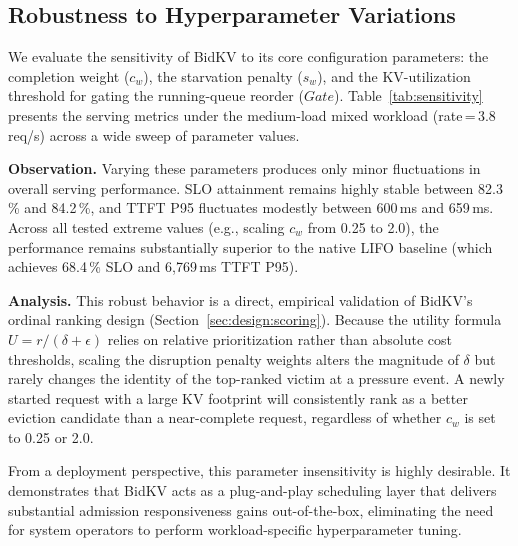 \documentclass[sigconf,nonacm]{acmart}
\newcommand{\bidkv}{BidKV\xspace}
\newcommand{\qualdelta}{\ensuremath{\delta}}
\begin{document}
\subsection{Robustness to Hyperparameter Variations}
\label{sec:eval:robustness}

We evaluate the sensitivity of \bidkv to its core configuration parameters: the completion weight ($c_w$), the starvation penalty ($s_w$), and the KV-utilization threshold for gating the running-queue reorder ($Gate$). Table~\ref{tab:sensitivity} presents the serving metrics under the medium-load mixed workload (rate\,=\,3.8\,req/s) across a wide sweep of parameter values.

\textbf{Observation.} Varying these parameters produces only minor fluctuations in overall serving performance. SLO attainment remains highly stable between 82.3\,\% and 84.2\,\%, and TTFT P95 fluctuates modestly between 600\,ms and 659\,ms. Across all tested extreme values (e.g., scaling $c_w$ from 0.25 to 2.0), the performance remains substantially superior to the native LIFO baseline (which achieves 68.4\,\% SLO and 6{,}769\,ms TTFT P95).

\textbf{Analysis.} This robust behavior is a direct, empirical validation of \bidkv's ordinal ranking design (Section~\ref{sec:design:scoring}). Because the utility formula $U = r / (\qualdelta + \epsilon)$ relies on relative prioritization rather than absolute cost thresholds, scaling the disruption penalty weights alters the magnitude of $\qualdelta$ but rarely changes the identity of the top-ranked victim at a pressure event. A newly started request with a large KV footprint will consistently rank as a better eviction candidate than a near-complete request, regardless of whether $c_w$ is set to 0.25 or 2.0.

From a deployment perspective, this parameter insensitivity is highly desirable. It demonstrates that \bidkv acts as a plug-and-play scheduling layer that delivers substantial admission responsiveness gains out-of-the-box, eliminating the need for system operators to perform workload-specific hyperparameter tuning.
\end{document}
